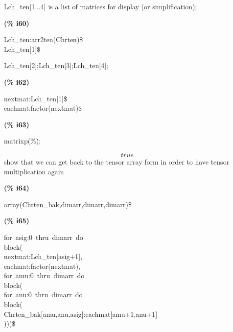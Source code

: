 \documentclass[fleqn]{article}
\begin{document}
\noindent%

Lch\_ten[1...4] is a list of matrices for display (or simplification);


\noindent
\begin{minipage}[t]{4.000000em}\color{red}\bfseries
(\% i60)	
\end{minipage}
\begin{minipage}[t]{\textwidth}\color{blue}
Lch\_ten:arr2ten(Chrten)\$\\
Lch\_ten[1]\$
\end{minipage}

\noindent%

Lch\_ten[2];Lch\_ten[3];Lch\_ten[4];


\noindent
\begin{minipage}[t]{4.000000em}\color{red}\bfseries
(\% i62)	
\end{minipage}
\begin{minipage}[t]{\textwidth}\color{blue}
nextmat:Lch\_ten[1]\$\\
eachmat:factor(nextmat)\$
\end{minipage}

\noindent%



\noindent
\begin{minipage}[t]{4.000000em}\color{red}\bfseries
(\% i63)	
\end{minipage}
\begin{minipage}[t]{\textwidth}\color{blue}
matrixp(\%);
\end{minipage}
\[\displaystyle \tag{\% o63} 
true\mbox{}
\]
show that we can get back to the tensor array form in order to have tensor multiplication again


\noindent
\begin{minipage}[t]{4.000000em}\color{red}\bfseries
(\% i64)	
\end{minipage}
\begin{minipage}[t]{\textwidth}\color{blue}
array(Chrten\_bak,dimarr,dimarr,dimarr)\$
\end{minipage}

\noindent%



\noindent
\begin{minipage}[t]{4.000000em}\color{red}\bfseries
(\% i65)	
\end{minipage}
\begin{minipage}[t]{\textwidth}\color{blue}
for\ asig:0\ thru\ dimarr\ do\\
block(\\
nextmat:Lch\_ten[asig+1],\\
eachmat:factor(nextmat),\\
for\ amu:0\ thru\ dimarr\ do\\
block(\\
for\ anu:0\ thru\ dimarr\ do\\
block(\\
Chrten\_bak[amu,anu,asig]:eachmat[amu+1,anu+1]\\
)))\$
\end{minipage}
\end{document}
